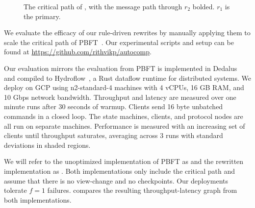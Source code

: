 \begin{figure}[t]
     \caption{The critical path of \ScalablePBFT{}, with the message path through $r_2$ bolded. $r_1$ is the primary.}
    \label{fig:decoupledPBFT}
\end{figure}

We evaluate the efficacy of our rule-driven rewrites by manually applying them to scale the critical path of PBFT~\cite{pbft}.
Our experimental scripts and setup can be found at \url{https://github.com/rithvikp/autocomp}.

Our evaluation mirrors the evaluation from \sigmodpaper{}
PBFT is implemented in Dedalus~\cite{dedalus} and compiled to Hydroflow~\cite{hydroflow}, a Rust dataflow runtime for distributed systems.
We deploy on GCP using n2-standard-4 machines with 4 vCPUs, 16 GB RAM, and 10 Gbps network bandwidth.
Throughput and latency are measured over one minute runs after 30 seconds of warmup.
Clients send 16 byte unbatched commands in a closed loop.
The state machines, clients, and protocol nodes are all run on separate machines.
Performance is measured with an increasing set of clients until throughput saturates, averaging across 3 runs with standard deviations in shaded regions.

We will refer to the unoptimized implementation of PBFT as \BasePBFT{} and the rewritten implementation as \ScalablePBFT{}.
Both implementations only include the critical path and assume that there is no view-change and no checkpoints.
Our deployments tolerate $f=1$ failures.
 compares the resulting throughput-latency graph from both implementations.

